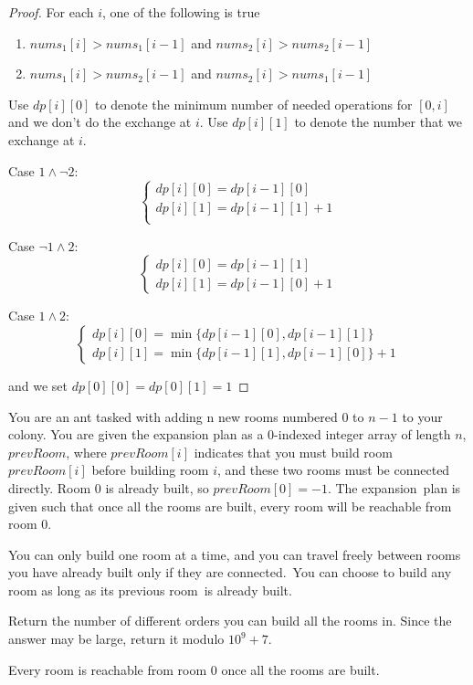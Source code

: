 \documentclass[11pt]{article}
\begin{document}
\begin{proof}
For each \(i\), one of the following is true
\begin{enumerate}
\item \(nums_1[i]>nums_1[i-1]\) and \(nums_2[i]>nums_2[i-1]\)
\item \(nums_1[i]>nums_2[i-1]\) and \(nums_2[i]>nums_1[i-1]\)
\end{enumerate}

Use \(dp[i][0]\) to denote the minimum number of needed operations for \([0,i]\) and we don't do
the exchange at \(i\). Use \(dp[i][1]\) to denote the number that we exchange at \(i\).

Case \(1\wedge \neg2\):
\begin{equation*}
\begin{cases}
dp[i][0]=dp[i-1][0]\\
dp[i][1]=dp[i-1][1]+1\\
\end{cases}
\end{equation*}

Case \(\neg1\wedge 2\):
\begin{equation*}
\begin{cases}
dp[i][0]=dp[i-1][1]\\
dp[i][1]=dp[i-1][0]+1
\end{cases}
\end{equation*}

Case \(1\wedge 2\):
\begin{equation*}
\begin{cases}
dp[i][0]=\min\{dp[i-1][0],dp[i-1][1]\}\\
dp[i][1]=\min\{dp[i-1][1],dp[i-1][0]\}+1
\end{cases}
\end{equation*}

and we set \(dp[0][0]=dp[0][1]=1\)
\end{proof}

\begin{problem}
You are an ant tasked with adding n new rooms numbered \(0\) to \(n-1\) to your colony. You are given
the expansion plan as a \(0\)-indexed integer array of length \(n\), \(prevRoom\), where \(prevRoom[i]\)
indicates that you must build room \(prevRoom[i]\) before building room \(i\), and these two rooms must
be connected directly. Room \(0\) is already built, so \(prevRoom[0]=-1\). The expansion plan is given
such that once all the rooms are built, every room will be reachable from room \(0\).

You can only build one room at a time, and you can travel freely between rooms you have already
built only if they are connected. You can choose to build any room as long as its previous
room is already built.

Return the number of different orders you can build all the rooms in. Since the answer may be
large, return it modulo \(10^9 + 7\).

Every room is reachable from room \(0\) once all the rooms are built.
\end{problem}
\end{document}
